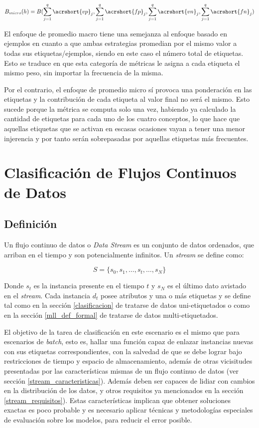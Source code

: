 \begin{equation}
   B_{micro}(h) = B( \sum_{j=1}^{q} \acrshort{vp}_{j}, \sum_{j=1}^{q}
   \acrshort{fp}_{j},\sum_{j=1}^{q}  \acrshort{vn}_{j},\sum_{j=1}^{q}
   \acrshort{fn}_{j})
\end{equation}

El enfoque de promedio macro tiene una semejanza al enfoque basado en ejemplos
en cuanto a que ambas estrategias promedian por el mismo valor a todas sus
etiquetas/ejemplos, siendo en este caso el número total de etiquetas. Esto se
traduce en que esta categoría de métricas le asigna a cada etiqueta el mismo
peso, sin importar la frecuencia de la misma. 

Por el contrario, el enfoque de promedio micro sí provoca una ponderación en las
etiquetas y la contribución de cada etiqueta al valor final no será el mismo.
Esto sucede porque la métrica se computa solo una vez, habiendo ya calculado la
cantidad de etiquetas para cada uno de los cuatro conceptos, lo que hace que
aquellas etiquetas que se activan en escasas ocasiones vayan a tener una menor
injerencia y por tanto serán sobrepasadas por aquellas etiquetas más frecuentes.

\section{Clasificación de Flujos Continuos de Datos}

\subsection{Definición}

Un flujo continuo de datos o \textit{Data Stream} es un conjunto de datos
ordenados, que arriban en el tiempo y son potencialmente infinitos. Un
\textit{stream} se define como:

\begin{equation}
   S = \{s_{0}, s_{1}, \dots, s_{t}, \dots, s_{N}\}
\end{equation}

Donde $s_{t}$ es la instancia presente en el tiempo $t$ y $s_{N}$ es el
último dato avistado en el \textit{stream}. Cada instancia $d_{t}$ posee
atributos y una o más etiquetas y se define tal como en la sección
\ref{clasificacion} de tratarse de datos uni-etiquetados o como en la sección
\ref{mll_def_formal} de tratarse de datos multi-etiquetados. 

El objetivo de la tarea de clasificación en este escenario es el mismo que para
escenarios de \textit{batch}, esto es, hallar una función capaz de enlazar
instancias nuevas con sus etiquetas correspondientes, con la salvedad de que se
debe lograr bajo restricciones de tiempo y espacio de almacenamiento, además de
otras vicisitudes presentadas por las características mismas de un flujo
continuo de datos (ver sección \ref{stream_caracteristicas}). Además deben ser
capaces de lidiar con cambios en la distribución de los datos, y otros
requisitos ya mencionados en la sección \ref{stream_requisitos}). Estas
características implican que obtener soluciones exactas es poco probable y es
necesario aplicar técnicas y metodologías especiales de evaluación sobre los
modelos, para reducir el error posible.

